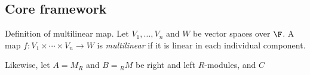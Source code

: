 \subsection{Core framework}

\begin{keyidea}{Definition of multilinear map.}
	Let $V_1, \dots, V_n$ and $W$ be vector spaces over $\F$. A map $f: V_1 \times \cdots \times V_n \to W$ is \emph{multilinear} if it is linear in each individual component.
	
	Likewise, let $A = M_R$ and $B = {_RM}$ be right and left $R$-modules, and $C$ 
\end{keyidea}